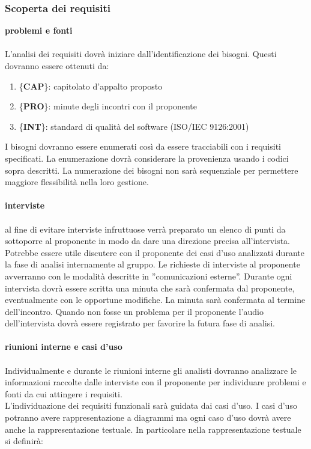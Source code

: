 {{		\subsubsection{Scoperta dei requisiti}{
			\textbf{problemi e fonti}\\\\
			L’analisi dei requisiti dovrà iniziare dall’identificazione dei bisogni. Questi dovranno essere ottenuti da:
			\begin{enumerate}
				\item \{\textbf{CAP}\}: capitolato d'appalto proposto
				\item \{\textbf{PRO}\}: minute degli incontri con il proponente
				\item \{\textbf{INT}\}: standard di qualità del software (ISO/IEC 9126:2001)
			\end{enumerate}
			I bisogni dovranno essere enumerati così da essere tracciabili con i requisiti specificati.
			La enumerazione dovrà considerare la provenienza usando i codici sopra descritti. La numerazione dei bisogni non sarà sequenziale per permettere maggiore flessibilità nella loro gestione.\\\\
			\textbf{interviste}\\\\
			al fine di evitare interviste infruttuose verrà preparato un elenco di punti da sottoporre al proponente in modo da dare una direzione precisa all’intervista. Potrebbe essere utile discutere
			con il proponente dei casi d’uso analizzati durante la fase di analisi internamente al gruppo.
			Le richieste di interviste al proponente avverranno con le modalità descritte in ”comunicazioni esterne”. Durante ogni intervista dovrà essere scritta una minuta che sarà confermata dal proponente, eventualmente con le opportune modifiche. La minuta sarà confermata al termine dell’incontro. Quando non fosse un problema per il proponente l’audio dell’intervista dovrà essere registrato per favorire la futura fase di analisi.\\\\
			\textbf{riunioni interne e casi d'uso}\\\\
			Individualmente e durante le riunioni interne gli analisti dovranno analizzare le informazioni raccolte dalle interviste con il proponente per individuare problemi e fonti da cui attingere i requisiti.\\
			L’individuazione dei requisiti funzionali sarà guidata dai casi d’uso. I casi d’uso potranno avere rappresentazione a diagrammi ma ogni caso d’uso dovrà avere anche la rappresentazione testuale. In particolare nella rappresentazione testuale si definirà:
}}}
